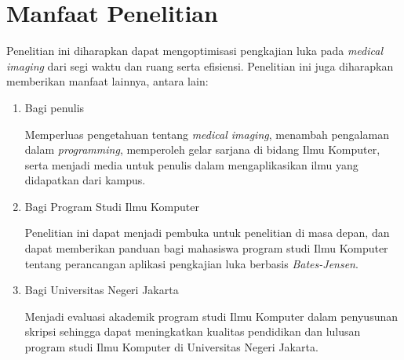 \section{Manfaat Penelitian}
Penelitian ini diharapkan dapat mengoptimisasi pengkajian luka pada \textit{medical imaging} dari segi waktu dan ruang serta efisiensi. Penelitian ini juga diharapkan memberikan manfaat lainnya, antara lain:
\begin{enumerate}
	\item Bagi penulis
		
	Memperluas pengetahuan tentang \textit{medical imaging}, menambah pengalaman dalam \textit{programming}, memperoleh gelar sarjana di bidang Ilmu Komputer, serta menjadi media untuk penulis dalam mengaplikasikan ilmu yang didapatkan dari kampus.
		
	\item Bagi Program Studi Ilmu Komputer
	 	
	Penelitian ini dapat menjadi pembuka untuk penelitian di masa depan, dan dapat memberikan panduan bagi mahasiswa program studi Ilmu Komputer tentang perancangan aplikasi pengkajian luka berbasis \textit{Bates-Jensen}.
	
	\item Bagi Universitas Negeri Jakarta
	 	
	Menjadi evaluasi akademik program studi Ilmu Komputer dalam penyusunan skripsi sehingga dapat meningkatkan kualitas pendidikan dan lulusan program studi Ilmu Komputer di Universitas Negeri Jakarta.
	 			
\end{enumerate}


\begin{comment}

\end{comment}
